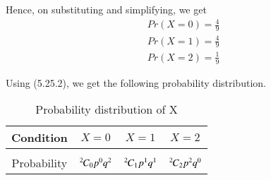 \documentclass[journal,12pt,twocolumn]{IEEEtran}
\begin{document}
\newline
Hence, on substituting and simplifying, we get
\begin{align}
    \tag{5.25.6}
    Pr(X=0)=\frac{4}{9}\\
    \tag{5.25.7}
    Pr(X=1)=\frac{4}{9}\\
    \tag{5.25.8}
    Pr(X=2)=\frac{1}{9}
\end{align}
\begin{comment}
Therefore, the pmf for $X$ (theoretical) is
\begin{align}
    \tag{5.25.11}
    \Pr(X=i) = 
	\begin{cases}
	\dfrac{4}{9}, & i=0 \\~\\[-1em]
	\dfrac{4}{9}, & i=1 \\~\\[-1em]
	\dfrac{1}{9}, & i=2 \\~\\[-1em]
	0, & otherwise
	\end{cases}
\end{align}
\end{comment}
\newline
Using (5.25.2), we get the following probability distribution.
\begin{table}[h!]
\centering
\caption{Probability distribution of X}
\label{table:1}
\begin{tabular}{|c||c|c|c|}
    \hline
    Condition & $X = 0$& $X =1 $& $X=2$ \\
    \hline
    & & &\\
    Probability & ${{}^{2}\mkern-1muC_{0}}p^{0}q^{2}$ & ${{}^{2}\mkern-1muC_{1}}p^{1}q^{1}$ & ${{}^{2}\mkern-1muC_{2}}p^{2}q^{0}$\\[1ex]
    \hline
\end{tabular}
\end{table}
\begin{comment}

\begin{center}
\caption{Probability distribution of X}
\label{table:2}
\begin{tabular}{|c||c|c|c|}
    \hline
    Condition & $X = 0$& $X =1 $& $X=2$ \\
    \hline
    & & &\\
    Probability & $\comb{2}{0}p^{0}q^{2}$ & $\comb{2}{1}p^{1}q^{1}$ & $\comb{2}{2}p^{2}q^{0}$\\[1ex]
    \hline
\end{tabular}
\end{center}
\end{comment}
\end{document}
